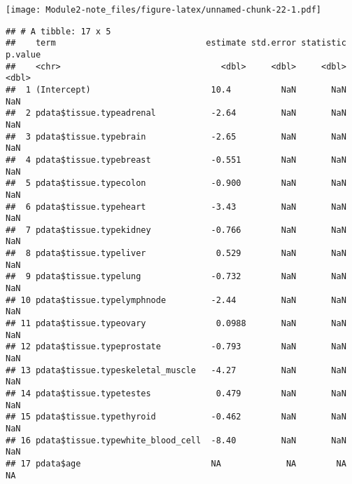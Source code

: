 \documentclass[]{article}
\newenvironment{Shaded}{\begin{snugshade}}{\end{snugshade}}
\newcommand{\KeywordTok}[1]{\textcolor[rgb]{0.13,0.29,0.53}{\textbf{#1}}}
\newcommand{\StringTok}[1]{\textcolor[rgb]{0.31,0.60,0.02}{#1}}
\newcommand{\OperatorTok}[1]{\textcolor[rgb]{0.81,0.36,0.00}{\textbf{#1}}}
\newcommand{\NormalTok}[1]{#1}
\begin{document}
\texttt{[image: Module2-note\_files/figure-latex/unnamed-chunk-22-1.pdf]}

\begin{Shaded}
\end{Shaded}

\begin{verbatim}
## # A tibble: 17 x 5
##    term                              estimate std.error statistic p.value
##    <chr>                                <dbl>     <dbl>     <dbl>   <dbl>
##  1 (Intercept)                        10.4          NaN       NaN     NaN
##  2 pdata$tissue.typeadrenal           -2.64         NaN       NaN     NaN
##  3 pdata$tissue.typebrain             -2.65         NaN       NaN     NaN
##  4 pdata$tissue.typebreast            -0.551        NaN       NaN     NaN
##  5 pdata$tissue.typecolon             -0.900        NaN       NaN     NaN
##  6 pdata$tissue.typeheart             -3.43         NaN       NaN     NaN
##  7 pdata$tissue.typekidney            -0.766        NaN       NaN     NaN
##  8 pdata$tissue.typeliver              0.529        NaN       NaN     NaN
##  9 pdata$tissue.typelung              -0.732        NaN       NaN     NaN
## 10 pdata$tissue.typelymphnode         -2.44         NaN       NaN     NaN
## 11 pdata$tissue.typeovary              0.0988       NaN       NaN     NaN
## 12 pdata$tissue.typeprostate          -0.793        NaN       NaN     NaN
## 13 pdata$tissue.typeskeletal_muscle   -4.27         NaN       NaN     NaN
## 14 pdata$tissue.typetestes             0.479        NaN       NaN     NaN
## 15 pdata$tissue.typethyroid           -0.462        NaN       NaN     NaN
## 16 pdata$tissue.typewhite_blood_cell  -8.40         NaN       NaN     NaN
## 17 pdata$age                          NA             NA        NA      NA
\end{verbatim}

\begin{Shaded}
\end{Shaded}
\end{document}
